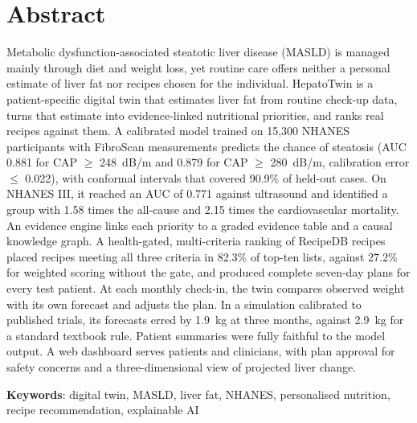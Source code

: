\chapter*{\centering Abstract}

Metabolic dysfunction-associated steatotic liver disease (MASLD) is managed
mainly through diet and weight loss, yet routine care offers neither a
personal estimate of liver fat nor recipes chosen for the individual.
HepatoTwin is a patient-specific digital twin that estimates liver fat from
routine check-up data, turns that estimate into evidence-linked nutritional
priorities, and ranks real recipes against them. A calibrated model trained on
15,300 NHANES participants with FibroScan measurements predicts the chance of
steatosis (AUC 0.881 for CAP $\geq$ 248~dB/m and 0.879 for CAP $\geq$
280~dB/m, calibration error $\leq$ 0.022), with conformal intervals that
covered 90.9\% of held-out cases. On NHANES III, it reached an AUC of 0.771
against ultrasound and identified a group with 1.58 times the all-cause and
2.15 times the cardiovascular mortality. An evidence engine links each
priority to a graded evidence table and a causal knowledge graph. A
health-gated, multi-criteria ranking of RecipeDB recipes placed recipes
meeting all three criteria in 82.3\% of top-ten lists, against 27.2\% for
weighted scoring without the gate, and produced complete seven-day plans for
every test patient. At each monthly check-in, the twin compares observed
weight with its own forecast and adjusts the plan. In a simulation calibrated
to published trials, its forecasts erred by 1.9~kg at three months, against
2.9~kg for a standard textbook rule. Patient summaries were fully faithful to
the model output. A web dashboard serves patients and clinicians, with plan
approval for safety concerns and a three-dimensional view of projected liver
change.

\vspace{0.4in}
\noindent\textbf{Keywords}: digital twin, MASLD, liver fat, NHANES,
personalised nutrition, recipe recommendation, explainable AI
\par
